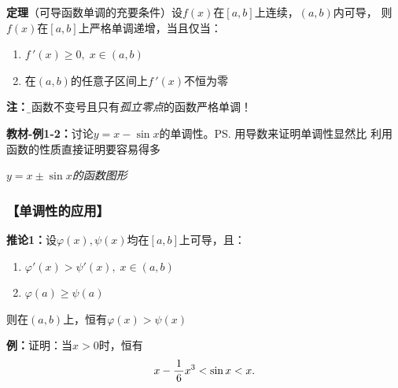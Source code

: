 {\bf 定理}（可导函数单调的充要条件）设$f(x)$在$[a,b]$上连续，$(a,b)$内可导，
则$f(x)$在$[a,b]$上严格单调递增，当且仅当：
\begin{enumerate}[(1)]
  \setlength{\itemindent}{1cm}
  \item $f\,'(x)\geq 0,\;x\in(a,b)$
  \item 在$(a,b)$的任意子区间上$f\,'(x)$不恒为零
\end{enumerate}

{\bf 注：}{\b 导函数不变号且只有{\it 孤立零点}的函数严格单调！}

{\bf 教材-例1-2：}讨论$y=x-\sin x$的单调性。\ps{用导数来证明单调性显然比
利用函数的性质直接证明要容易得多}

\begin{center}
	
	{\it $y=x\pm\sin x$的函数图形}
\end{center}

\subsubsection{【单调性的应用】}

{\bf 推论1：}设$\varphi(x),\psi(x) $均在$[a,b]$上可导，且：
\begin{enumerate}[(1)]
  \setlength{\itemindent}{1cm}
  \item $\varphi'(x)>\psi'(x),\;x\in(a,b)$
  \item $\varphi(a)\geq\psi(a)$
\end{enumerate}
则在$(a,b)$上，恒有$\varphi(x)>\psi(x)$

{\bf 例：}证明：当$x>0$时，恒有
$$x-\displaystyle\frac{\,{1}\,}{\,{6}\,}x^3<\sin x<x.$$

